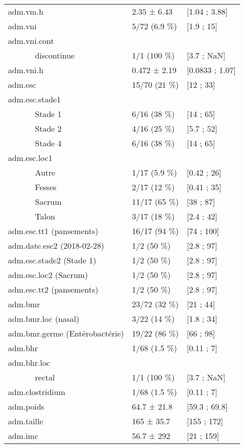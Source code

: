 \documentclass[]{article}
\begin{document}
\begin{longtable}{lll}
  adm.vm.h & 2.35 ± 6.43 & [1.04 ; 3.88] \\ 
  adm.vni & 5/72 (6.9 \%) &  [1.9 ; 15] \\ 
  adm.vni.cont &   &   \\ 
  ~~~~~~ discontinue & 1/1 (100 \%) &  [3.7 ; NaN] \\ 
  adm.vni.h & 0.472 ± 2.19 & [0.0833 ; 1.07] \\ 
  adm.esc & 15/70 (21 \%) &  [12 ; 33] \\ 
  adm.esc.stade1 &   &   \\ 
  ~~~~~~ Stade 1 & 6/16 (38 \%) &  [14 ; 65] \\ 
  ~~~~~~ Stade 2 & 4/16 (25 \%) &  [5.7 ; 52] \\ 
  ~~~~~~ Stade 4 & 6/16 (38 \%) &  [14 ; 65] \\ 
  adm.esc.loc1 &   &   \\ 
  ~~~~~~ Autre & 1/17 (5.9 \%) &  [0.42 ; 26] \\ 
  ~~~~~~ Fesses & 2/17 (12 \%) &  [0.41 ; 35] \\ 
  ~~~~~~ Sacrum & 11/17 (65 \%) &  [38 ; 87] \\ 
  ~~~~~~ Talon & 3/17 (18 \%) &  [2.4 ; 42] \\ 
  adm.esc.tt1 (pansements) & 16/17 (94 \%) &  [74 ; 100] \\ 
  adm.date.esc2 (2018-02-28) & 1/2 (50 \%) &  [2.8 ; 97] \\ 
  adm.esc.stade2 (Stade 1) & 1/2 (50 \%) &  [2.8 ; 97] \\ 
  adm.esc.loc2 (Sacrum) & 1/2 (50 \%) &  [2.8 ; 97] \\ 
  adm.esc.tt2 (pansements) & 1/2 (50 \%) &  [2.8 ; 97] \\ 
  adm.bmr & 23/72 (32 \%) &  [21 ; 44] \\ 
  adm.bmr.loc (nasal) & 3/22 (14 \%) &  [1.8 ; 34] \\ 
  adm.bmr.germe (Entérobactérie) & 19/22 (86 \%) &  [66 ; 98] \\ 
  adm.bhr & 1/68 (1.5 \%) &  [0.11 ; 7] \\ 
  adm.bhr.loc &   &   \\ 
  ~~~~~~ rectal & 1/1 (100 \%) &  [3.7 ; NaN] \\ 
  adm.clostridium & 1/68 (1.5 \%) &  [0.11 ; 7] \\ 
  adm.poids & 64.7 ± 21.8 & [59.3 ; 69.8] \\ 
  adm.taille & 165 ± 35.7 & [155 ; 172] \\ 
  adm.imc & 56.7 ± 292 & [21 ; 159] \\ 

\end{longtable}
\end{document}
